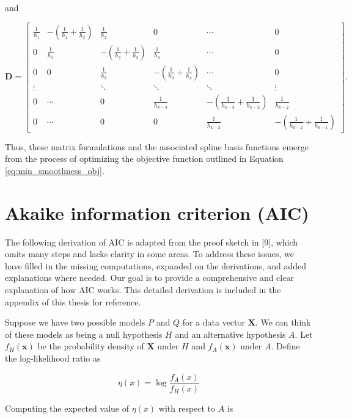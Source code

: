 \documentclass[
11pt, %
oneside, %
english, %
singlespacing, %
]{macthesis} %
\begin{document}
and

\begin{equation}
\mathbf{D} = 
\begin{bmatrix}
\frac{1}{h_1} & -\left(\frac{1}{h_1} + \frac{1}{h_2}\right) & \frac{1}{h_2} & 0 & \cdots & 0 \\
0 & \frac{1}{h_2} & -\left(\frac{1}{h_2} + \frac{1}{h_3}\right) & \frac{1}{h_3} & \cdots & 0 \\
0 & 0 & \frac{1}{h_3} & -\left(\frac{1}{h_3} + \frac{1}{h_4}\right) & \cdots & 0 \\
\vdots & & \ddots & \ddots & \ddots & \vdots \\
0 & \cdots & 0 & \frac{1}{h_{k-3}} & -\left(\frac{1}{h_{k-3}} + \frac{1}{h_{k-2}}\right) & \frac{1}{h_{k-2}} \\
0 & \cdots & 0 & 0 & \frac{1}{h_{k-2}} & -\left(\frac{1}{h_{k-2}} + \frac{1}{h_{k-1}}\right)
\end{bmatrix}.
\label{eq: spline_matrix_element_D}
\end{equation}

Thus, these matrix formulations and the associated spline basis functions emerge from the process of optimizing the objective function outlined in Equation \ref{eq:min_smoothness_obj}.

\section{Akaike information criterion (AIC)}\label{AIC}

The following derivation of AIC is adapted from the proof sketch in {[}9{]}, which omits many steps and lacks clarity in some areas. To address these issues, we have filled in the missing computations, expanded on the derivations, and added explanations where needed. Our goal is to provide a comprehensive and clear explanation of how AIC works. This detailed derivation is included in the appendix of this thesis for reference.

Suppose we have two possible models \(P\) and \(Q\) for a data vector \(\mathbf{X}\). We can think of these models as being a null hypothesis \(H\) and an alternative hypothesis \(A\). Let \(f_H(\mathbf{x})\) be the probability density of \(\mathbf{X}\) under \(H\) and \(f_A(\mathbf{x})\) under \(A\). Define the log-likelihood ratio as

\[
\eta(x) = \log \frac{f_A(x)}{f_H(x)} 
\]

Computing the expected value of \(\eta(x)\) with respect to \(A\) is
\end{document}
